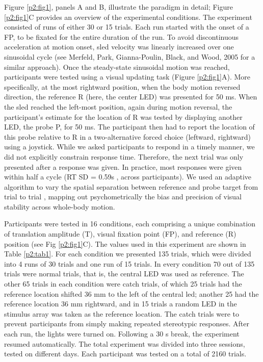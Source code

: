 Figure \ref{p2:fig1}, panels A and B, illustrate the paradigm in detail; Figure \ref{p2:fig1}C provides an overview of the experimental conditions. The experiment consisted of runs of either 30 or 15 trials. Each run started with the onset of a FP, to be fixated for the entire duration of the run. To avoid discontinuous acceleration at motion onset, sled velocity was linearly increased over one sinusoidal cycle (see Merfeld, Park, Gianna-Poulin, Black, and Wood, 2005 for a similar approach). Once the steady-state sinusoidal motion was reached, participants were tested using a visual updating task (Figure \ref{p2:fig1}A). More specifically, at the most rightward position, when the body motion reversed direction, the reference R (here, the center LED) was presented for 50 ms. When the sled reached the left-most position, again during motion reversal, the participant's estimate for the location of R was tested by displaying another LED, the probe P, for 50 ms. The participant then had to report the location of this probe relative to R in a two-alternative forced choice (leftward, rightward) using a joystick. While we asked participants to respond in a timely manner, we did not explicitly constrain response time. Therefore, the next trial was only presented after a response was given. In practice, most responses were given within half a cycle (RT {\textpm}SD = 0.59s , across participants). We used an adaptive algorithm to vary the spatial separation between reference and probe target from trial to trial \cite{kontsevich1999}, mapping out psychometrically the bias and precision of visual stability across whole-body motion. 

Participants were tested in 16 conditions, each comprising a unique combination of translation amplitude (T), visual fixation point (FP), and reference (R) position (see Fig \ref{p2:fig1}C). The values used in this experiment are shown in Table \ref{p2:tab1}. For each condition we presented 135 trials, which were divided into 4 runs of 30 trials and one run of 15 trials. In every condition 70 out of 135 trials were normal trials, that is, the central LED was used as reference. The other 65 trials in each condition were catch trials, of which 25 trials had the reference location shifted 36 mm to the left of the central led; another 25 had the reference location 36 mm rightward, and in 15 trials a random LED in the stimulus array was taken as the reference location. The catch trials were to prevent participants from simply making repeated stereotypic responses. After each run, the lights were turned on. Following a 30 s break, the experiment resumed automatically. The total experiment was divided into three sessions, tested on different days.  Each participant was tested on a total of 2160 trials.

